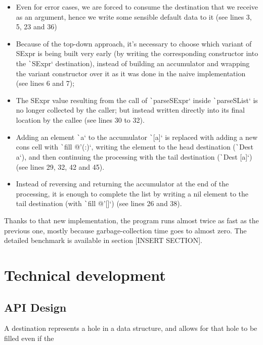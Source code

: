 \documentclass[english]{jflart}
\begin{document}
\begin{itemize}
  \item Even for error cases, we are forced to consume the destination that we receive as an argument, hence we write some sensible default data to it (see lines 3, 5, 23 and 36)
  \item Because of the top-down approach, it's necessary to choose which variant of SExpr is being built very early (by writing the corresponding constructor into the \texttt`SExpr` destination), instead of building an accumulator and wrapping the variant constructor over it as it was done in the naive implementation (see lines 6 and 7);
  \item The SExpr value resulting from the call of \texttt`parseSExpr` inside \texttt`parseSList` is no longer collected by the caller; but instead written directly into its final location by the callee (see lines 30 to 32).
  \item Adding an element \texttt`a` to the accumulator \texttt`[a]` is replaced with adding a new cons cell with \texttt`fill @'(:)`, writing the element to the head destination (\texttt`Dest a`), and then continuing the processing with the tail destination (\texttt`Dest [a]`) (see lines 29, 32, 42 and 45).
  \item Instead of reversing and returning the accumulator at the end of the processing, it is enough to complete the list by writing a nil element to the tail destination (with \texttt`fill @'[]`) (see lines 26 and 38).
\end{itemize}

Thanks to that new implementation, the program runs almost twice as fast as the previous one, mostly because garbage-collection time goes to almost zero. The detailed benchmark is available in section [INSERT SECTION].

\section{Technical development}

\subsection{API Design}

A destination represents a hole in a data structure, and allows for that hole to be filled even if the 
\end{document}
